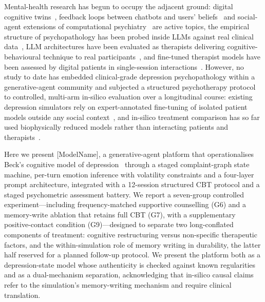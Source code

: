 \documentclass[sn-nature,pdflatex]{sn-jnl}
\begin{document}
Mental-health research has begun to occupy the adjacent ground: digital cognitive twins~\cite{doraiswamy2025}, feedback loops between chatbots and users' beliefs~\cite{dohany2026} and social-agent extensions of computational psychiatry~\cite{rhoads2024} are active topics, the empirical structure of psychopathology has been probed inside LLMs against real clinical data~\cite{kambeitz2025nmh}, LLM architectures have been evaluated as therapists delivering cognitive-behavioural technique to real participants~\cite{rollwage2026}, and fine-tuned therapist models have been assessed by digital patients in single-session interactions~\cite{yosef2025}. However, no study to date has embedded clinical-grade depression psychopathology within a generative-agent community and subjected a structured psychotherapy protocol to controlled, multi-arm in-silico evaluation over a longitudinal course: existing depression simulators rely on expert-annotated fine-tuning of isolated patient models outside any social context~\cite{liu2025}, and in-silico treatment comparison has so far used biophysically reduced models rather than interacting patients and therapists~\cite{montague2012,hauser2022,deco2024}.

Here we present [ModelName], a generative-agent platform that operationalises Beck's cognitive model of depression~\cite{beck1967} through a staged complaint-graph state machine, per-turn emotion inference with volatility constraints and a four-layer prompt architecture, integrated with a 12-session structured CBT protocol and a staged psychometric assessment battery. We report a seven-group controlled experiment---including frequency-matched supportive counselling (G6) and a memory-write ablation that retains full CBT (G7), with a supplementary positive-contact condition (G9)---designed to separate two long-conflated components of treatment: cognitive restructuring versus non-specific therapeutic factors, and the within-simulation role of memory writing in durability, the latter half reserved for a planned follow-up protocol. We present the platform both as a depression-state model whose authenticity is checked against known regularities and as a dual-mechanism separation, acknowledging that in-silico causal claims refer to the simulation's memory-writing mechanism and require clinical translation.

\end{document}
